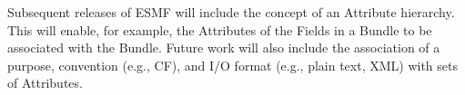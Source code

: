 %

Subsequent releases of ESMF will include the concept of an Attribute
hierarchy.  This will enable, for example, the Attributes of the Fields
in a Bundle to be associated with the Bundle.  Future work will also
include the association of a purpose, convention (e.g., CF), and I/O format
(e.g., plain text, XML) with sets of Attributes.


